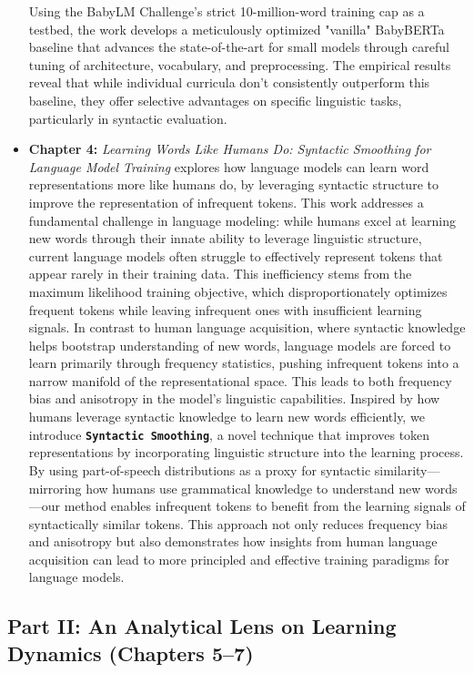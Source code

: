 \begin{itemize}
    Using the BabyLM Challenge's strict 10-million-word training cap as a testbed, the work develops a meticulously optimized "vanilla" BabyBERTa baseline that advances the state-of-the-art for small models through careful tuning of architecture, vocabulary, and preprocessing. The empirical results reveal that while individual curricula don't consistently outperform this baseline, they offer selective advantages on specific linguistic tasks, particularly in syntactic evaluation.

    \item \textbf{Chapter 4:} \emph{Learning Words Like Humans Do: Syntactic Smoothing for Language Model Training}  
    explores how language models can learn word representations more like humans do, by leveraging syntactic structure to improve the representation of infrequent tokens. This work addresses a fundamental challenge in language modeling: while humans excel at learning new words through their innate ability to leverage linguistic structure, current language models often struggle to effectively represent tokens that appear rarely in their training data. This inefficiency stems from the maximum likelihood training objective, which disproportionately optimizes frequent tokens while leaving infrequent ones with insufficient learning signals. In contrast to human language acquisition, where syntactic knowledge helps bootstrap understanding of new words, language models are forced to learn primarily through frequency statistics, pushing infrequent tokens into a narrow manifold of the representational space. This leads to both frequency bias and anisotropy in the model's linguistic capabilities. Inspired by how humans leverage syntactic knowledge to learn new words efficiently, we introduce \textbf{\texttt{Syntactic Smoothing}}, a novel technique that improves token representations by incorporating linguistic structure into the learning process. By using part-of-speech distributions as a proxy for syntactic similarity—mirroring how humans use grammatical knowledge to understand new words—our method enables infrequent tokens to benefit from the learning signals of syntactically similar tokens. This approach not only reduces frequency bias and anisotropy but also demonstrates how insights from human language acquisition can lead to more principled and effective training paradigms for language models.

\end{itemize}

\subsection*{Part II: An Analytical Lens on Learning Dynamics (Chapters 5–7)}

